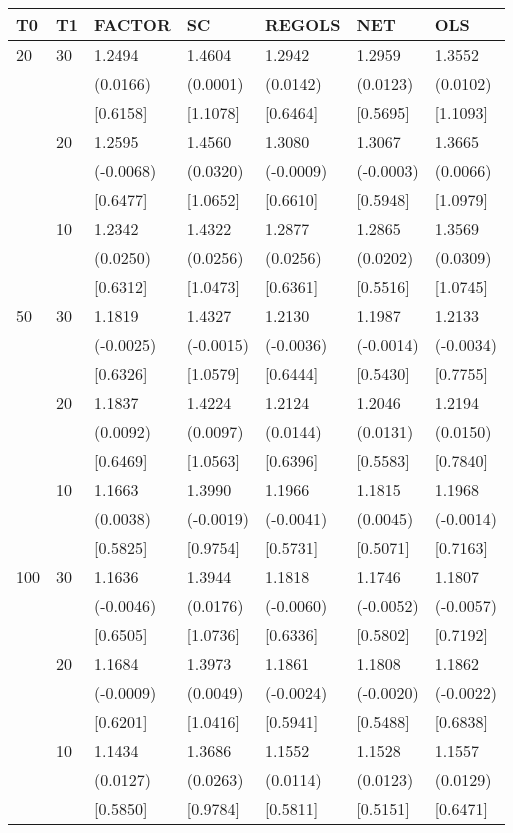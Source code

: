 \begin{table}[ht]
\centering
\begin{tabular}{lllllll}
\hline
T0&T1&FACTOR&SC&REGOLS&NET&OLS\\
\hline
20&30&1.2494&1.4604&1.2942&1.2959&1.3552\\
&&(0.0166)&(0.0001)&(0.0142)&(0.0123)&(0.0102)\\
&&[0.6158]&[1.1078]&[0.6464]&[0.5695]&[1.1093]\\
&20&1.2595&1.4560&1.3080&1.3067&1.3665\\
&&(-0.0068)&(0.0320)&(-0.0009)&(-0.0003)&(0.0066)\\
&&[0.6477]&[1.0652]&[0.6610]&[0.5948]&[1.0979]\\
&10&1.2342&1.4322&1.2877&1.2865&1.3569\\
&&(0.0250)&(0.0256)&(0.0256)&(0.0202)&(0.0309)\\
&&[0.6312]&[1.0473]&[0.6361]&[0.5516]&[1.0745]\\

50&30&1.1819&1.4327&1.2130&1.1987&1.2133\\
&&(-0.0025)&(-0.0015)&(-0.0036)&(-0.0014)&(-0.0034)\\
&&[0.6326]&[1.0579]&[0.6444]&[0.5430]&[0.7755]\\
&20&1.1837&1.4224&1.2124&1.2046&1.2194\\
&&(0.0092)&(0.0097)&(0.0144)&(0.0131)&(0.0150)\\
&&[0.6469]&[1.0563]&[0.6396]&[0.5583]&[0.7840]\\
&10&1.1663&1.3990&1.1966&1.1815&1.1968\\
&&(0.0038)&(-0.0019)&(-0.0041)&(0.0045)&(-0.0014)\\
&&[0.5825]&[0.9754]&[0.5731]&[0.5071]&[0.7163]\\

100&30&1.1636&1.3944&1.1818&1.1746&1.1807\\
&&(-0.0046)&(0.0176)&(-0.0060)&(-0.0052)&(-0.0057)\\
&&[0.6505]&[1.0736]&[0.6336]&[0.5802]&[0.7192]\\
&20&1.1684&1.3973&1.1861&1.1808&1.1862\\
&&(-0.0009)&(0.0049)&(-0.0024)&(-0.0020)&(-0.0022)\\
&&[0.6201]&[1.0416]&[0.5941]&[0.5488]&[0.6838]\\
&10&1.1434&1.3686&1.1552&1.1528&1.1557\\
&&(0.0127)&(0.0263)&(0.0114)&(0.0123)&(0.0129)\\
&&[0.5850]&[0.9784]&[0.5811]&[0.5151]&[0.6471]\\
\hline
\end{tabular}
\end{table}

